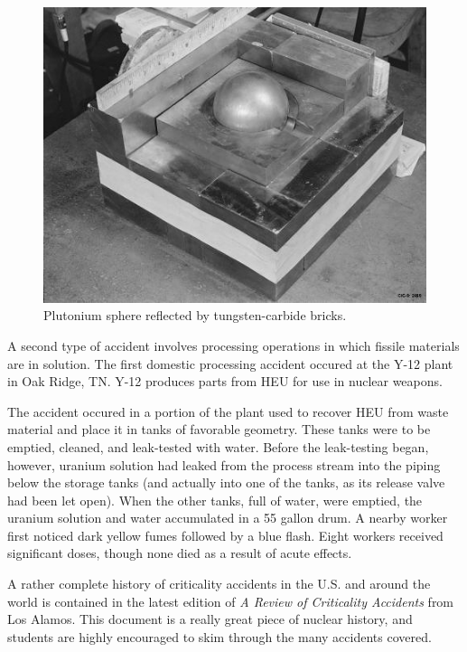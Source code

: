 \begin{figure}[ht] 
    \centering
    \includegraphics[keepaspectratio, width = 5.0 in]{images/pu_sphere}
    \caption{Plutonium sphere reflected by tungsten-carbide bricks.}
    \label{fig:pu_sphere}
\end{figure}

A second type of accident involves processing operations in which
fissile materials are in solution.  The first domestic processing
accident occured at the Y-12 plant in Oak Ridge, TN.  Y-12 
produces parts from HEU for use in nuclear weapons.  

The accident occured in a portion of the plant used to 
recover HEU from waste material and place it in tanks of favorable
geometry.  These tanks were to be emptied, cleaned, and leak-tested 
with water.  Before the leak-testing began, however, uranium 
solution had leaked from the process stream into the piping
below the storage tanks (and actually into one of the tanks,
as its release valve had been let open).  When the other tanks, full
of water, were emptied, the uranium solution and water accumulated
in a 55 gallon drum.  A nearby worker first noticed dark yellow
fumes followed by a blue flash.  Eight workers received significant
doses, though none died as a result of acute effects.

A rather complete history of criticality accidents in the U.S. and
around the world is contained in the latest edition of
 \textit{A Review of Criticality Accidents} from Los Alamos.  This
document is a really great piece of nuclear history, and students
are highly encouraged to skim through the many accidents covered.

